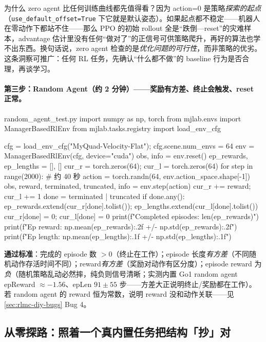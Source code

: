 \begin{insight}\label{ins:rlmc-diy-zeroagent}
为什么 zero agent 比任何训练曲线都先值得看？因为 action=0 是策略\emph{探索的起点}（\verb|use_default_offset=True| 下它就是默认姿态）。如果起点都不稳定——机器人在零动作下都站不住——那么 PPO 的初始 rollout 全是“跌倒—reset”的灾难样本，advantage 估计里没有任何“做对了”的正信号可供策略爬升，再好的算法也学不出东西。换句话说，zero agent 检查的是\emph{优化问题的可行性}，而非策略的优劣。这条洞察可推广：任何 RL 任务，先确认“什么都不做”的 baseline 行为是否合理，再谈学习。
\end{insight}

\paragraph{第三步：Random Agent（约 2 分钟）——奖励有方差、终止会触发、reset 正常。}

\begin{codebox}[Python]{random\_agent\_test.py}
import numpy as np, torch
from mjlab.envs import ManagerBasedRlEnv
from mjlab.tasks.registry import load_env_cfg

cfg = load_env_cfg("MyQuad-Velocity-Flat"); cfg.scene.num_envs = 64
env = ManagerBasedRlEnv(cfg, device="cuda")
obs, info = env.reset()
ep_rewards, ep_lengths = [], []
cur_r = torch.zeros(64); cur_l = torch.zeros(64)
for step in range(2000):                       # 约 40 秒
    action = torch.randn(64, env.action_space.shape[-1])
    obs, reward, terminated, truncated, info = env.step(action)
    cur_r += reward; cur_l += 1
    done = terminated | truncated
    if done.any():
        ep_rewards.extend(cur_r[done].tolist()); ep_lengths.extend(cur_l[done].tolist())
        cur_r[done] = 0; cur_l[done] = 0
print(f"Completed episodes: {len(ep_rewards)}")
print(f"Ep reward: {np.mean(ep_rewards):.2f} +/- {np.std(ep_rewards):.2f}")
print(f"Ep length: {np.mean(ep_lengths):.1f} +/- {np.std(ep_lengths):.1f}")
\end{codebox}

\textbf{通过标准}：完成的 episode 数 $>0$（终止在工作）；episode 长度\emph{有方差}（不同随机动作存活时间不同）；reward\emph{有方差}（奖励对动作有区分度）；episode reward 为\emph{负}（随机策略乱动必然摔，纯负则信号清晰；实测内置 Go1 random agent epReward $\approx -1.56$、epLen $91\pm 55$ 步——方差大正说明终止/奖励都在工作）。若 random agent 的 reward 恒为常数，说明 reward 没和动作关联——见 \cref{sec:rlmc-diy-bugs} Bug 4。

\subsection{从零探路：照着一个真内置任务把结构「抄」对}
\label{sec:rlmc-diy-explore}

